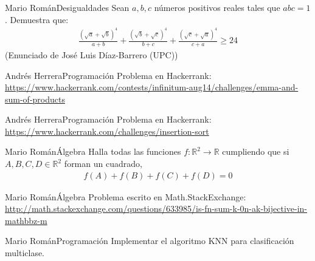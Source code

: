 \documentclass[a4paper, 11pt]{article} %
\numberwithin{prbcounter}{section}
\begin{document}
  
  
  \begin{enunciado}{Mario Román}{Desigualdades}
    Sean $a, b, c$ números positivos reales tales que $abc = 1$. Demuestra que:
    \begin{gather*}
      \frac{\left(\sqrt{a}+\sqrt{b}\right)^4}{a+b}+\frac{\left(\sqrt{b}+\sqrt{c}\right)^4}{b+c}+\frac{\left(\sqrt{c}+\sqrt{a}\right)^4}{c+a}\geq24
    \end{gather*}
    (Enunciado de José Luis Díaz-Barrero (UPC))
  \end{enunciado}

  
  
  \begin{enunciado}{Andrés Herrera}{Programación}
    Problema en Hackerrank:
    \url{https://www.hackerrank.com/contests/infinitum-aug14/challenges/emma-and-sum-of-products}
  \end{enunciado}

  
  
  
  \begin{enunciado}{Andrés Herrera}{Programación}
    Problema en Hackerrank:
    \url{https://www.hackerrank.com/challenges/insertion-sort}
  \end{enunciado}
    
    
  
  \begin{enunciado}{Mario Román}{Álgebra}
    Halla todas las funciones $f: \mathbb{R}^2 \rightarrow \mathbb{R}$ cumpliendo
    que si $A,B,C,D \in \mathbb{R}^2$ forman un cuadrado,
    \begin{gather*}
      f(A) + f(B) + f(C) + f(D) = 0
    \end{gather*}
  \end{enunciado}
  
  
  \begin{enunciado}{Mario Román}{Álgebra}
    Problema escrito en Math.StackExchange:
    \url{http://math.stackexchange.com/questions/633985/is-fn-sum-k-0n-ak-bijective-in-mathbbz-m}
  \end{enunciado}

  \begin{enunciado}{Mario Román}{Programación}
    Implementar el algoritmo KNN para clasificación multiclase.
  \end{enunciado}
\end{document}
